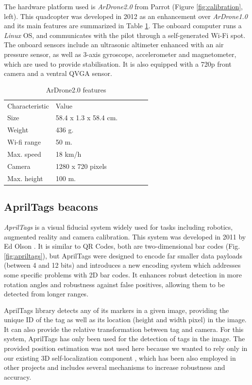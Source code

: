 \documentclass{styles/svproc}
\begin{document}
	The hardware platform used is \textit{ArDrone2.0} from Parrot (Figure \ref{fig:calibration}, left). This quadcopter was developed in 2012 as an enhancement over \textit{ArDrone1.0} and its main features are summarized in Table \ref{table:quadrotor}. The onboard computer runs a \textit{Linux} OS, and communicates with the pilot through a self-generated Wi-Fi spot. The onboard sensors include an ultrasonic altimeter enhanced with an air pressure sensor, as well as 3-axis gyroscope, accelerometer and magnetometer, which are used to provide stabilisation. It is also equipped with a 720p front camera and a ventral QVGA sensor.
	
	\begin{table}
	\centering
	\setlength\tabcolsep{7pt}
	\caption{ArDrone2.0 features}
	\begin{tabular}{llllll}
	\hline\noalign{\smallskip}
	Characteristic  & Value\\
	\noalign{\smallskip}
	\hline
	\noalign{\smallskip}
		Size & 58.4 x 1.3 x 58.4 cm. \\
		Weight & 436 g. \\
		Wi-fi range & 50 m. \\
		Max. speed & 18 km/h \\
		Camera  & 1280 x 720 pixels \\
		Max. height & 100 m.\\
	\hline
	\end{tabular}
        \label{table:quadrotor}
	\end{table}

\subsection{AprilTags beacons}

	\textit{AprilTags} is a visual fiducial system widely used for tasks including robotics, augmented reality and camera calibration. This system was developed in 2011 by Ed Olson \cite{eolson}. It is similar to QR Codes, both are two-dimensional bar codes (Fig. \ref{fig:apriltags}), but AprilTags were designed to encode far smaller data payloads (between 4 and 12 bits) and introduces a new encoding system which addresses some specific problems with 2D bar codes. It enhances robust detection in more rotation angles and robustness against false positives, allowing them to be detected from longer ranges.
	
	AprilTags library detects any of its markers in a given image, providing the unique ID of the tag as well as its location (height and width pixel) in the image. It can also provide the relative transformation between tag and camera. For this system, AprilTags has only been used for the detection of tags in the image. The provided position estimation was not used here because we wanted to rely only in our existing 3D self-localization component \cite{lopezceron2016}, which has been also employed in other projects and includes several mechanisms to increase robustness and accuracy.
	
\end{document}
